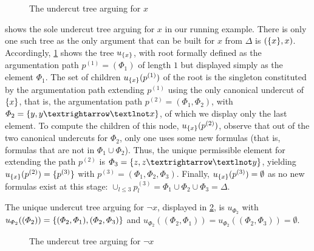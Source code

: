 \documentclass[version=3.21, pagesize, twoside=off, bibliography=totoc, DIV=calc, fontsize=12pt, a4paper, french, english]{scrartcl}
\begin{document}
\begin{figure}
	\caption{The undercut tree arguing for $x$}
	\label{fig:utx}
\end{figure}
\begin{example}
	\label{ex:abstUnder}
	 shows the sole undercut tree arguing for $x$ in our running example. There is only one such tree as the only argument that can be built for $x$ from $\Delta$ is $(\{x\}, x)$. Accordingly, \cref{fig:utx} shows the tree $u_{\{x\}}$, with root formally defined as the argumentation path $p^{(1)} = (\Phi_1)$ of length $1$ but displayed simply as the element $\Phi_1$. 
	The set of children $u_{\{x\}}(p^{(1)})$ of the root is the singleton constituted by the argumentation path extending $p^{(1)}$ using the only canonical undercut of $\{x\}$, that is, the argumentation path $p^{(2)} = (\Phi_1, \Phi_2)$, with $\Phi_2 = \set{y, y → ¬x}$, of which we display only the last element.
	To compute the children of this node, $u_{\{x\}}(p^{(2)})$, observe that out of the two canonical undercuts for $\Phi_2$, only one uses some new formulas (that is, formulas that are not in $\Phi_1 \cup \Phi_2$). Thus, the unique permissible element for extending the path $p^{(2)}$ is $\Phi_3 = \set{z, z → ¬y}$, yielding $u_{\{x\}}(p^{(2)}) = \{p^{(3)}\}$ with $p^{(3)} = (\Phi_1, \Phi_2, \Phi_3)$. 
	Finally, $u_{\{x\}}(p^{(3)}) = \emptyset$ as no new formulas exist at this stage: $\cup_{l ≤ 3} p^{(3)}_l = \Phi_1 \cup \Phi_2 \cup \Phi_3 = \Delta$.
	
	The unique undercut tree arguing for $¬x$, displayed in \cref{fig:utnx}, is $u_{\Phi_2}$ with $u_{\Phi_2}((\Phi_2)) = \{(\Phi_2, \Phi_1), (\Phi_2, \Phi_3)\}$ and $u_{\Phi_2}((\Phi_2, \Phi_1)) = u_{\Phi_2}((\Phi_2, \Phi_3)) = \emptyset$.
\end{example}
\begin{figure}
	\caption{The undercut tree arguing for $¬x$}
	\label{fig:utnx}
\end{figure}
\end{document}
